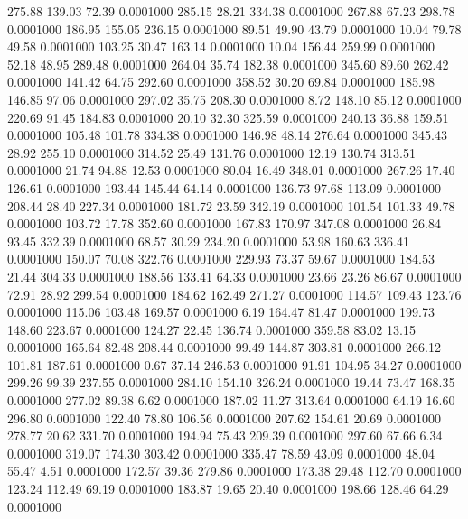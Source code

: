  275.88  139.03   72.39   0.0001000
 285.15   28.21  334.38   0.0001000
 267.88   67.23  298.78   0.0001000
 186.95  155.05  236.15   0.0001000
  89.51   49.90   43.79   0.0001000
  10.04   79.78   49.58   0.0001000
 103.25   30.47  163.14   0.0001000
  10.04  156.44  259.99   0.0001000
  52.18   48.95  289.48   0.0001000
 264.04   35.74  182.38   0.0001000
 345.60   89.60  262.42   0.0001000
 141.42   64.75  292.60   0.0001000
 358.52   30.20   69.84   0.0001000
 185.98  146.85   97.06   0.0001000
 297.02   35.75  208.30   0.0001000
   8.72  148.10   85.12   0.0001000
 220.69   91.45  184.83   0.0001000
  20.10   32.30  325.59   0.0001000
 240.13   36.88  159.51   0.0001000
 105.48  101.78  334.38   0.0001000
 146.98   48.14  276.64   0.0001000
 345.43   28.92  255.10   0.0001000
 314.52   25.49  131.76   0.0001000
  12.19  130.74  313.51   0.0001000
  21.74   94.88   12.53   0.0001000
  80.04   16.49  348.01   0.0001000
 267.26   17.40  126.61   0.0001000
 193.44  145.44   64.14   0.0001000
 136.73   97.68  113.09   0.0001000
 208.44   28.40  227.34   0.0001000
 181.72   23.59  342.19   0.0001000
 101.54  101.33   49.78   0.0001000
 103.72   17.78  352.60   0.0001000
 167.83  170.97  347.08   0.0001000
  26.84   93.45  332.39   0.0001000
  68.57   30.29  234.20   0.0001000
  53.98  160.63  336.41   0.0001000
 150.07   70.08  322.76   0.0001000
 229.93   73.37   59.67   0.0001000
 184.53   21.44  304.33   0.0001000
 188.56  133.41   64.33   0.0001000
  23.66   23.26   86.67   0.0001000
  72.91   28.92  299.54   0.0001000
 184.62  162.49  271.27   0.0001000
 114.57  109.43  123.76   0.0001000
 115.06  103.48  169.57   0.0001000
   6.19  164.47   81.47   0.0001000
 199.73  148.60  223.67   0.0001000
 124.27   22.45  136.74   0.0001000
 359.58   83.02   13.15   0.0001000
 165.64   82.48  208.44   0.0001000
  99.49  144.87  303.81   0.0001000
 266.12  101.81  187.61   0.0001000
   0.67   37.14  246.53   0.0001000
  91.91  104.95   34.27   0.0001000
 299.26   99.39  237.55   0.0001000
 284.10  154.10  326.24   0.0001000
  19.44   73.47  168.35   0.0001000
 277.02   89.38    6.62   0.0001000
 187.02   11.27  313.64   0.0001000
  64.19   16.60  296.80   0.0001000
 122.40   78.80  106.56   0.0001000
 207.62  154.61   20.69   0.0001000
 278.77   20.62  331.70   0.0001000
 194.94   75.43  209.39   0.0001000
 297.60   67.66    6.34   0.0001000
 319.07  174.30  303.42   0.0001000
 335.47   78.59   43.09   0.0001000
  48.04   55.47    4.51   0.0001000
 172.57   39.36  279.86   0.0001000
 173.38   29.48  112.70   0.0001000
 123.24  112.49   69.19   0.0001000
 183.87   19.65   20.40   0.0001000
 198.66  128.46   64.29   0.0001000
